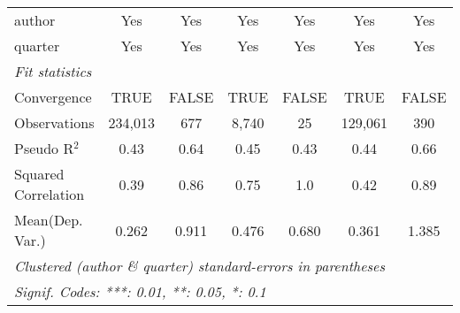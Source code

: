 \begin{tabular}{lcccccc}
   author                                                     & Yes           & Yes          & Yes           & Yes           & Yes            & Yes\\  
   quarter                                                    & Yes           & Yes          & Yes           & Yes           & Yes            & Yes\\  
   \midrule
   \emph{Fit statistics}\\
   Convergence                                                &TRUE           & FALSE        & TRUE          & FALSE         & TRUE           & FALSE\\  
   Observations                                               & 234,013       & 677          & 8,740         & 25            & 129,061        & 390\\  
   Pseudo R$^2$                                               & 0.43          & 0.64         & 0.45          & 0.43          & 0.44           & 0.66\\  
   Squared Correlation                                        & 0.39          & 0.86         & 0.75          & 1.0           & 0.42           & 0.89\\  
Mean(Dep. Var.) & 0.262 & 0.911 & 0.476 & 0.680 & 0.361 & 1.385 \\
   \midrule \midrule
   \multicolumn{7}{l}{\emph{Clustered (author \& quarter) standard-errors in parentheses}}\\
   \multicolumn{7}{l}{\emph{Signif. Codes: ***: 0.01, **: 0.05, *: 0.1}}\\
\end{tabular}
\par\endgroup
